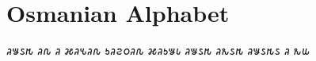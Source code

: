 \section{Osmanian Alphabet}

\bgroup
\newfontfamily{}
\osmanian
𐒚𐒁𐒖𐒄 𐒚𐒐 𐒚 𐒎𐒚𐒍𐒚𐒐 𐒑𐒚𐒒𐒠𐒚𐒐 𐒎𐒚𐒑𐒁𐒗 𐒚𐒁𐒖𐒄 𐒚𐒌𐒖𐒄 𐒚𐒁𐒖𐒄𐒖 𐒚
𐒌𐒜
\egroup

